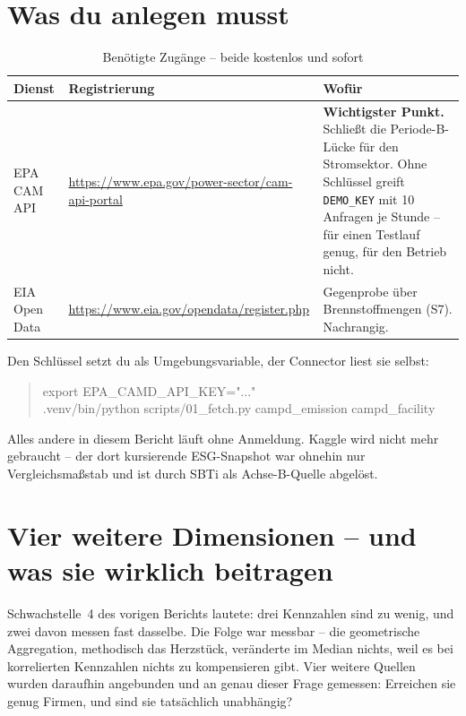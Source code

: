 \documentclass[11pt,a4paper]{article}
\begin{document}
\section{Was du anlegen musst}
\label{sec:accounts}

\begin{table}[htbp]
\centering\small
\caption{Benötigte Zugänge -- beide kostenlos und sofort}
\label{tab:accounts}
\begin{tabularx}{\textwidth}{P{3.2cm} P{5.4cm} X}
\toprule
\textbf{Dienst} & \textbf{Registrierung} & \textbf{Wofür} \\
\midrule
EPA CAM API & \url{https://www.epa.gov/power-sector/cam-api-portal} & \textbf{Wichtigster Punkt.} Schließt die Periode-B-Lücke für den Stromsektor. Ohne Schlüssel greift \texttt{DEMO\_KEY} mit 10 Anfragen je Stunde -- für einen Testlauf genug, für den Betrieb nicht. \\
EIA Open Data & \url{https://www.eia.gov/opendata/register.php} & Gegenprobe über Brennstoffmengen (S7). Nachrangig. \\
\bottomrule
\end{tabularx}
\end{table}

Den Schlüssel setzt du als Umgebungsvariable, der Connector liest sie selbst:

\begin{quote}\footnotesize\ttfamily
export EPA\_CAMD\_API\_KEY="..." \\
.venv/bin/python scripts/01\_fetch.py campd\_emission campd\_facility
\end{quote}

Alles andere in diesem Bericht läuft ohne Anmeldung. Kaggle wird nicht mehr gebraucht -- der dort kursierende ESG-Snapshot war ohnehin nur Vergleichsmaßstab und ist durch SBTi als Achse-B-Quelle abgelöst.

\section{Vier weitere Dimensionen -- und was sie wirklich beitragen}

Schwachstelle~4 des vorigen Berichts lautete: drei Kennzahlen sind zu wenig, und zwei davon messen fast dasselbe. Die Folge war messbar -- die geometrische Aggregation, methodisch das Herzstück, veränderte im Median nichts, weil es bei korrelierten Kennzahlen nichts zu kompensieren gibt. Vier weitere Quellen wurden daraufhin angebunden und an genau dieser Frage gemessen: Erreichen sie genug Firmen, und sind sie tatsächlich unabhängig?
\end{document}
